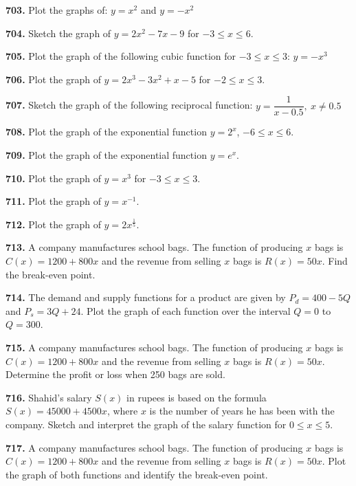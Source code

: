 \documentclass[11pt]{article}
\begin{document}
\bigskip
\noindent\textbf{703.} Plot the graphs of: $y=x^2$ and $y=-x^2$

\bigskip
\noindent\textbf{704.} Sketch the graph of $y=2x^2-7x-9$ for $-3\leq x\leq6$.

\bigskip
\noindent\textbf{705.} Plot the graph of the following cubic function for $-3\leq x\leq3$: $y=-x^3$

\bigskip
\noindent\textbf{706.} Plot the graph of $y=2x^3-3x^2+x-5$ for $-2\leq x\leq3$.

\bigskip
\noindent\textbf{707.} Sketch the graph of the following reciprocal function: $y=\dfrac{1}{x-0.5},\ x\neq0.5$

\bigskip
\noindent\textbf{708.} Plot the graph of the exponential function $y=2^{x}$, $-6\leq x\leq6$.

\bigskip
\noindent\textbf{709.} Plot the graph of the exponential function $y=e^{x}$.

\bigskip
\noindent\textbf{710.} Plot the graph of $y=x^3$ for $-3\leq x\leq3$.

\bigskip
\noindent\textbf{711.} Plot the graph of $y=x^{-1}$.

\bigskip
\noindent\textbf{712.} Plot the graph of $y=2x^{\frac{1}{5}}$.

\bigskip
\noindent\textbf{713.} A company manufactures school bags. The function of producing $x$ bags is $C(x)=1200+800x$ and the revenue from selling $x$ bags is $R(x)=50x$. Find the break-even point.

\bigskip
\noindent\textbf{714.} The demand and supply functions for a product are given by $P_d=400-5Q$ and $P_s=3Q+24$. Plot the graph of each function over the interval $Q=0$ to $Q=300$.

\bigskip
\noindent\textbf{715.} A company manufactures school bags. The function of producing $x$ bags is $C(x)=1200+800x$ and the revenue from selling $x$ bags is $R(x)=50x$. Determine the profit or loss when 250 bags are sold.

\bigskip
\noindent\textbf{716.} Shahid's salary $S(x)$ in rupees is based on the formula $S(x)=45000+4500x$, where $x$ is the number of years he has been with the company. Sketch and interpret the graph of the salary function for $0\leq x\leq5$.

\bigskip
\noindent\textbf{717.} A company manufactures school bags. The function of producing $x$ bags is $C(x)=1200+800x$ and the revenue from selling $x$ bags is $R(x)=50x$. Plot the graph of both functions and identify the break-even point.
\end{document}
